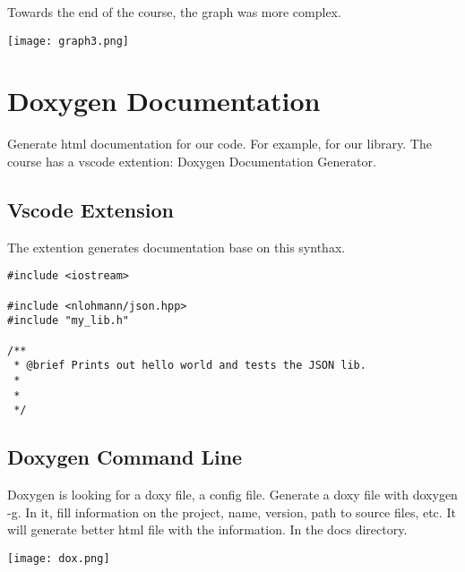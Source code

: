 Towards the end of the course, the graph was more complex.

\begin{center}
    \texttt{[image: graph3.png]}
\end{center}



\section{Doxygen Documentation}

Generate html documentation for our code. For example, for our library. The course has a vscode extention: Doxygen Documentation Generator.

\subsection{Vscode Extension}

The extention generates documentation base on this synthax.

\begin{verbatim}
#include <iostream>

#include <nlohmann/json.hpp>
#include "my_lib.h"

/**
 * @brief Prints out hello world and tests the JSON lib.
 *
 *
 */
\end{verbatim}

\subsection{Doxygen Command Line}

Doxygen is looking for a doxy file, a config file. Generate a doxy file with doxygen -g.
In it, fill information on the project, name, version,  path to source files, etc. It will generate better html file with the information.
In the docs directory.

\begin{center}
    \texttt{[image: dox.png]}
\end{center}

